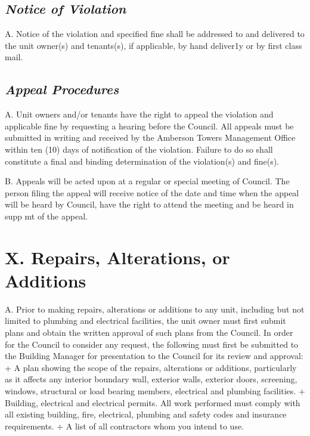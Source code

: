 \documentclass[
  14pt,
]{book}
\begin{document}
\hypertarget{notice-of-violation}{%
\subsection*{\texorpdfstring{\emph{Notice of Violation}}{Notice of Violation}}\label{notice-of-violation}}

A. Notice of the violation and specified fine shall be addressed to and delivered to the unit owner(s) and tenants(s), if applicable, by hand deliver1y or by first class mail.

\hypertarget{appeal-procedures}{%
\subsection*{\texorpdfstring{\emph{Appeal Procedures}}{Appeal Procedures}}\label{appeal-procedures}}

A. Unit owners and/or tenants have the right to appeal the violation and applicable fine by requesting a hearing before the Council. All appeals must be submitted in writing and received by the Amberson Towers Management Office within ten (10) days of notification of the violation. Failure to do so shall constitute a final and binding determination of the violation(s) and fine(s).

B. Appeals will be acted upon at a regular or special meeting of Council. The person filing the appeal will receive notice of the date and time when the appeal will be heard by Council, have the right to attend the meeting and be heard in supp mt of the appeal.

\hypertarget{x.-repairs-alterations-or-additions}{%
\section*{X. Repairs, Alterations, or Additions}\label{x.-repairs-alterations-or-additions}}

A. Prior to making repairs, alterations or additions to any unit, including but not limited to plumbing and electrical facilities, the unit owner must first submit plans and obtain the written approval of such plans from the Council. In order for the Council to consider any request, the following must first be submitted to the Building Manager for presentation to the Council for its review and approval:
+ A plan showing the scope of the repairs, alterations or additions, particularly as it affects any interior boundary wall, exterior walls, exterior doors, screening, windows, structural or load bearing members, electrical and plumbing facilities.
+ Building, electrical and electrical permits. All work performed must comply with all existing building, fire, electrical, plumbing and safety codes and insurance requirements.
+ A list of all contractors whom you intend to use.
\end{document}
